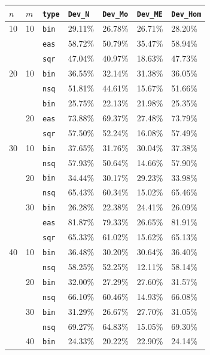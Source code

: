 \documentclass[a4paper,11pt, reqno]{amsart}
\begin{document}
\begin{table}[htbp]
\centering
\small
\begin{tabular}{|l|l|l|l|l|l|l|}
\hline
$n$ & $m$ & \texttt{type} & \texttt{Dev\_N} & \texttt{Dev\_Mo} & \texttt{Dev\_ME} & \texttt{Dev\_Hom} \\
\hline
{10} & {10} & \texttt{bin} & 29.11\% & 26.78\% & 26.71\% & 28.20\% \\
 &  & \texttt{eas} & 58.72\% & 50.79\% & 35.47\% & 58.94\% \\
 &  & \texttt{sqr} & 47.04\% & 40.97\% & 18.63\% & 47.73\% \\
\hline
{20} & 10 & \texttt{bin} & 36.55\% & 32.14\% & 31.38\% & 36.05\% \\
 &  & \texttt{nsq} & 51.81\% & 44.61\% & 15.67\% & 51.66\% \\
 & \multirow{3}{*}{20} & \texttt{bin} & 25.75\% & 22.13\% & 21.98\% & 25.35\% \\
 &  & \texttt{eas} & 73.88\% & 69.37\% & 27.48\% & 73.79\% \\
 &  & \texttt{sqr} & 57.50\% & 52.24\% & 16.08\% & 57.49\% \\
\hline
{30} & 10 & \texttt{bin} & 37.65\% & 31.76\% & 30.04\% & 37.38\% \\
 &  & \texttt{nsq} & 57.93\% & 50.64\% & 14.66\% & 57.90\% \\
 & 20 & \texttt{bin} & 34.44\% & 30.17\% & 29.23\% & 33.98\% \\
 &  & \texttt{nsq} & 65.43\% & 60.34\% & 15.02\% & 65.46\% \\
 & {30} & \texttt{bin} & 26.28\% & 22.38\% & 24.41\% & 26.09\% \\
 &  & \texttt{eas} & 81.87\% & 79.33\% & 26.65\% & 81.91\% \\
 &  & \texttt{sqr} & 65.33\% & 61.02\% & 15.62\% & 65.13\% \\
\hline
{40} & 10 & \texttt{bin} & 36.48\% & 30.20\% & 30.64\% & 36.40\% \\
 &  & \texttt{nsq} & 58.25\% & 52.25\% & 12.11\% & 58.14\% \\
 & 20 & \texttt{bin} & 32.00\% & 27.29\% & 27.60\% & 31.57\% \\
 &  & \texttt{nsq} & 66.10\% & 60.46\% & 14.93\% & 66.08\% \\
 & 30 & \texttt{bin} & 31.29\% & 26.67\% & 27.70\% & 31.05\% \\
 &  & \texttt{nsq} & 69.27\% & 64.83\% & 15.05\% & 69.30\% \\
 & {40} & \texttt{bin} & 24.33\% & 20.22\% & 22.90\% & 24.14\% \\

\end{tabular}
\end{table}
\end{document}
